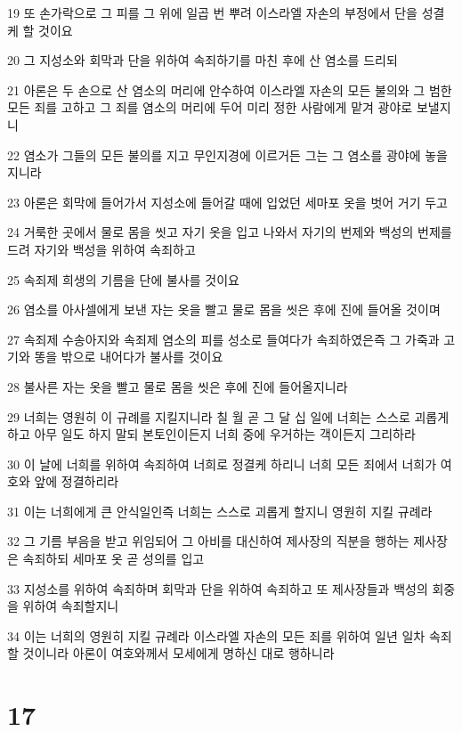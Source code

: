 \par 19 또 손가락으로 그 피를 그 위에 일곱 번 뿌려 이스라엘 자손의 부정에서 단을 성결케 할 것이요
\par 20 그 지성소와 회막과 단을 위하여 속죄하기를 마친 후에 산 염소를 드리되
\par 21 아론은 두 손으로 산 염소의 머리에 안수하여 이스라엘 자손의 모든 불의와 그 범한 모든 죄를 고하고 그 죄를 염소의 머리에 두어 미리 정한 사람에게 맡겨 광야로 보낼지니
\par 22 염소가 그들의 모든 불의를 지고 무인지경에 이르거든 그는 그 염소를 광야에 놓을지니라
\par 23 아론은 회막에 들어가서 지성소에 들어갈 때에 입었던 세마포 옷을 벗어 거기 두고
\par 24 거룩한 곳에서 물로 몸을 씻고 자기 옷을 입고 나와서 자기의 번제와 백성의 번제를 드려 자기와 백성을 위하여 속죄하고
\par 25 속죄제 희생의 기름을 단에 불사를 것이요
\par 26 염소를 아사셀에게 보낸 자는 옷을 빨고 물로 몸을 씻은 후에 진에 들어올 것이며
\par 27 속죄제 수송아지와 속죄제 염소의 피를 성소로 들여다가 속죄하였은즉 그 가죽과 고기와 똥을 밖으로 내어다가 불사를 것이요
\par 28 불사른 자는 옷을 빨고 물로 몸을 씻은 후에 진에 들어올지니라
\par 29 너희는 영원히 이 규례를 지킬지니라 칠 월 곧 그 달 십 일에 너희는 스스로 괴롭게 하고 아무 일도 하지 말되 본토인이든지 너희 중에 우거하는 객이든지 그리하라
\par 30 이 날에 너희를 위하여 속죄하여 너희로 정결케 하리니 너희 모든 죄에서 너희가 여호와 앞에 정결하리라
\par 31 이는 너희에게 큰 안식일인즉 너희는 스스로 괴롭게 할지니 영원히 지킬 규례라
\par 32 그 기름 부음을 받고 위임되어 그 아비를 대신하여 제사장의 직분을 행하는 제사장은 속죄하되 세마포 옷 곧 성의를 입고
\par 33 지성소를 위하여 속죄하며 회막과 단을 위하여 속죄하고 또 제사장들과 백성의 회중을 위하여 속죄할지니
\par 34 이는 너희의 영원히 지킬 규례라 이스라엘 자손의 모든 죄를 위하여 일년 일차 속죄할 것이니라 아론이 여호와께서 모세에게 명하신 대로 행하니라

\chapter{17}

